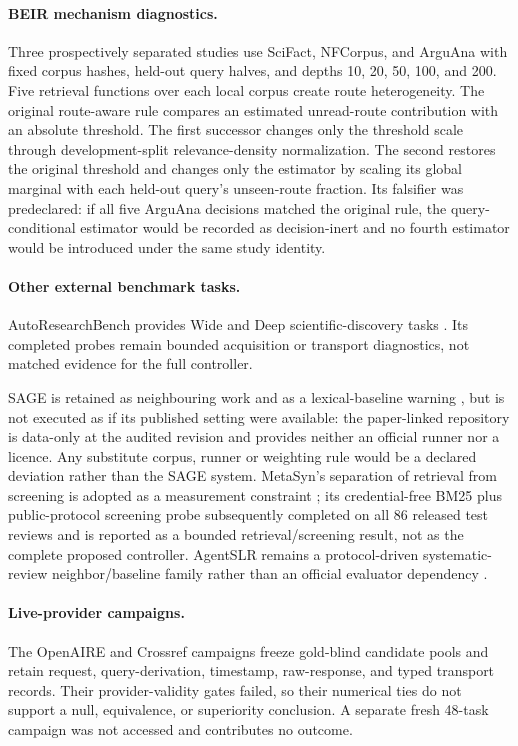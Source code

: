 \paragraph{BEIR mechanism diagnostics.}
Three prospectively separated studies use SciFact, NFCorpus, and ArguAna with
fixed corpus hashes, held-out query halves, and depths 10, 20, 50, 100, and 200.
Five retrieval functions over each local corpus create route heterogeneity.
The original route-aware rule compares an estimated unread-route contribution
with an absolute threshold. The first successor changes only the threshold scale
through development-split relevance-density normalization. The second restores
the original threshold and changes only the estimator by scaling its global
marginal with each held-out query's unseen-route fraction. Its falsifier was
predeclared: if all five ArguAna decisions matched the original rule, the
query-conditional estimator would be recorded as decision-inert and no fourth
estimator would be introduced under the same study identity.

\paragraph{Other external benchmark tasks.}
AutoResearchBench provides Wide and Deep scientific-discovery tasks
\cite{autoresearchbench2026}. Its completed probes remain bounded acquisition or
transport diagnostics, not matched evidence for the full controller.

SAGE is retained as neighbouring work and as a lexical-baseline warning
\cite{sage2026}, but is not executed as if its published setting were available:
the paper-linked repository is data-only at the audited revision and provides
neither an official runner nor a licence. Any substitute corpus, runner or
weighting rule would be a declared deviation rather than the SAGE system.
MetaSyn's separation of retrieval from screening is adopted as a measurement
constraint \cite{metasyn2026}; its credential-free BM25 plus public-protocol
screening probe subsequently completed on all 86 released test reviews and is
reported as a bounded retrieval/screening result, not as the complete proposed
controller.
AgentSLR remains a protocol-driven systematic-review neighbor/baseline family
rather than an official evaluator dependency \cite{agentslr2026}.

\paragraph{Live-provider campaigns.}
The OpenAIRE and Crossref campaigns freeze gold-blind candidate pools and retain
request, query-derivation, timestamp, raw-response, and typed transport records.
Their provider-validity gates failed, so their numerical ties do not support a
null, equivalence, or superiority conclusion. A separate fresh 48-task campaign
was not accessed and contributes no outcome.

